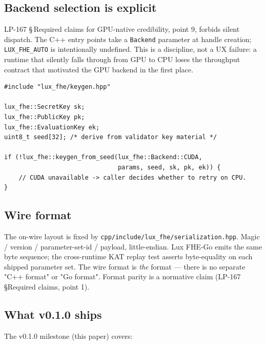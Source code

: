 \subsection{Backend selection is explicit}

LP-167 \S\,Required claims for GPU-native credibility, point 9, forbids
silent dispatch. The C++ entry points take a \texttt{Backend} parameter
at handle creation; \texttt{LUX\_FHE\_AUTO} is intentionally undefined.
This is a discipline, not a UX failure: a runtime that silently falls
through from GPU to CPU loses the throughput contract that motivated
the GPU backend in the first place.

\begin{lstlisting}
#include "lux_fhe/keygen.hpp"

lux_fhe::SecretKey sk;
lux_fhe::PublicKey pk;
lux_fhe::EvaluationKey ek;
uint8_t seed[32]; /* derive from validator key material */

if (!lux_fhe::keygen_from_seed(lux_fhe::Backend::CUDA,
                               params, seed, sk, pk, ek)) {
    // CUDA unavailable -> caller decides whether to retry on CPU.
}
\end{lstlisting}

\subsection{Wire format}

The on-wire layout is fixed by \texttt{cpp/include/lux\_fhe/serialization.hpp}.
Magic / version / parameter-set-id / payload, little-endian. Lux FHE-Go
emits the same byte sequence; the cross-runtime KAT replay test
asserts byte-equality on each shipped parameter set. The wire format
is \emph{the} format --- there is no separate "C++ format" or
"Go format". Format parity is a normative claim
(LP-167 \S Required claims, point 1).

\subsection{What v0.1.0 ships}

The v0.1.0 milestone (this paper) covers:

